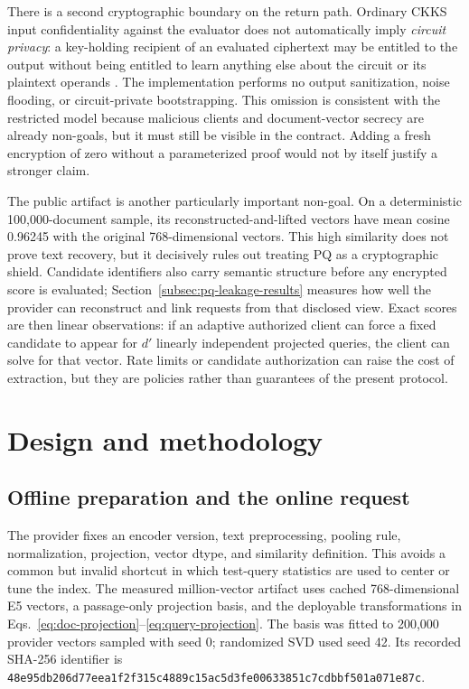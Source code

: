\documentclass[pdflatex,sn-basic,Numbered]{sn-jnl}
\theoremstyle{plain}
\begin{document}
There is a second cryptographic boundary on the return path. Ordinary CKKS input confidentiality against the evaluator does not automatically imply \emph{circuit privacy}: a key-holding recipient of an evaluated ciphertext may be entitled to the output without being entitled to learn anything else about the circuit or its plaintext operands \cite{Li2021ApproximateSecurity,Kluczniak2023CircuitPrivacy}. The implementation performs no output sanitization, noise flooding, or circuit-private bootstrapping. This omission is consistent with the restricted model because malicious clients and document-vector secrecy are already non-goals, but it must still be visible in the contract. Adding a fresh encryption of zero without a parameterized proof would not by itself justify a stronger claim.

The public artifact is another particularly important non-goal. On a deterministic 100,000-document sample, its reconstructed-and-lifted vectors have mean cosine 0.96245 with the original 768-dimensional vectors. This high similarity does not prove text recovery, but it decisively rules out treating PQ as a cryptographic shield. Candidate identifiers also carry semantic structure before any encrypted score is evaluated; Section~\ref{subsec:pq-leakage-results} measures how well the provider can reconstruct and link requests from that disclosed view. Exact scores are then linear observations: if an adaptive authorized client can force a fixed candidate to appear for $d'$ linearly independent projected queries, the client can solve for that vector. Rate limits or candidate authorization can raise the cost of extraction, but they are policies rather than guarantees of the present protocol.

\section{Design and methodology}\label{sec:design}

\subsection{Offline preparation and the online request}\label{subsec:offline}

The provider fixes an encoder version, text preprocessing, pooling rule, normalization, projection, vector dtype, and similarity definition. This avoids a common but invalid shortcut in which test-query statistics are used to center or tune the index. The measured million-vector artifact uses cached 768-dimensional E5 vectors, a passage-only projection basis, and the deployable transformations in Eqs.~\eqref{eq:doc-projection}--\eqref{eq:query-projection}. The basis was fitted to 200,000 provider vectors sampled with seed 0; randomized SVD used seed 42. Its recorded SHA-256 identifier is \texttt{48e95db206d77eea1f2f315c4889c15ac5d3fe00633851c7cdbbf501a071e87c}.
\end{document}
